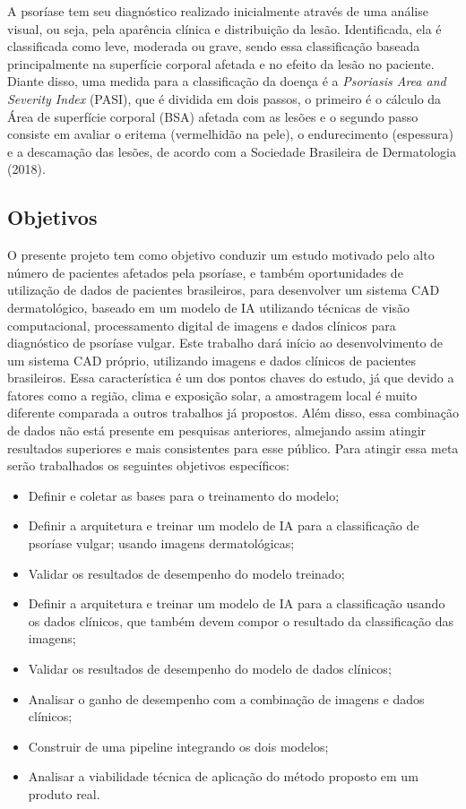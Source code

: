 A psoríase tem seu diagnóstico realizado inicialmente através de uma análise visual, ou seja, pela aparência clínica e distribuição da lesão. Identificada, ela é classificada como leve, moderada ou grave, sendo essa classificação baseada principalmente na superfície corporal afetada e no efeito da lesão no paciente. Diante disso, uma medida para a classificação da doença é a \textit{Psoriasis Area and Severity Index} (PASI), que é dividida em dois passos, o primeiro é o cálculo da Área de superfície corporal (BSA) afetada com as lesões e o segundo passo consiste em avaliar o eritema (vermelhidão na pele), o endurecimento (espessura) e a descamação das lesões, de acordo com a Sociedade Brasileira de Dermatologia (2018).

\subsection{Objetivos}
O presente projeto tem como objetivo conduzir um estudo motivado pelo alto número de pacientes afetados pela psoríase, e também oportunidades de utilização de dados de pacientes brasileiros, para desenvolver um sistema CAD dermatológico, baseado em um modelo de IA utilizando técnicas de visão computacional, processamento digital de imagens e dados clínicos para diagnóstico de psoríase vulgar. Este trabalho dará início ao desenvolvimento de um sistema CAD próprio,  utilizando imagens e dados clínicos de pacientes brasileiros. Essa característica é um dos pontos chaves do estudo, já que devido a fatores como a região, clima e exposição solar, a amostragem local é muito diferente comparada a outros trabalhos já propostos. Além disso,  essa combinação de dados não está presente em pesquisas anteriores, almejando assim atingir resultados superiores e mais consistentes para esse público. Para atingir essa meta serão trabalhados os seguintes objetivos específicos:
\begin{itemize}
  \item Definir e coletar as bases para o treinamento do modelo;
  \item Definir a arquitetura e treinar um modelo de IA para a classificação de psoríase vulgar; usando imagens dermatológicas;
  \item Validar os resultados de desempenho do modelo treinado;
  \item Definir a arquitetura e treinar um modelo de IA para a classificação usando os dados clínicos, que também devem compor o resultado da classificação das imagens;

  \item Validar os resultados de desempenho do modelo de dados clínicos;
  \item Analisar o ganho de desempenho com a combinação de imagens e dados clínicos;
  \item Construir de uma pipeline integrando os dois modelos;
  \item Analisar a viabilidade técnica de aplicação do método proposto em um produto real.

\end{itemize}
